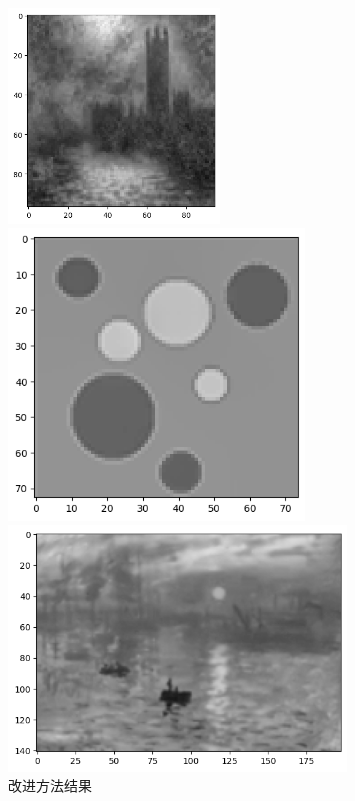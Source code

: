 \documentclass{article}
\begin{document}
\begin{figure}[htbp]
	\centering
		\begin{minipage}[c]{0.3\textwidth} %
			\centering
			\includegraphics[width=0.5\textwidth]{output1.png} %
			
		\end{minipage}%
		\begin{minipage}[c]{0.2\textwidth}
			\centering
			\includegraphics[width=0.7\textwidth]{output2.png}
			
		\end{minipage}
		\begin{minipage}[c]{0.2\textwidth}
			\centering
			\includegraphics[width=0.8\textwidth]{output3.png}
			
		\end{minipage}
		\caption*{改进方法结果}
\end{figure}
\end{document}
